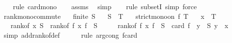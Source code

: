 \begin{isabellebody}
\ \ \isamarkupfalse%
\ {\isacharparenleft}{\kern0pt}rule\ card{\isacharunderscore}{\kern0pt}mono{\isacharparenright}{\kern0pt}\isanewline
\ \ \isamarkupfalse%
\ assms\ \isamarkupfalse%
\ simp\isanewline
\ \ \isamarkupfalse%
\ {\isacharparenleft}{\kern0pt}rule\ subsetI{\isacharcomma}{\kern0pt}\ simp{\isacharcomma}{\kern0pt}\ force{\isacharparenright}{\kern0pt}%
\endisatagproof
{\isafoldproof}%
%
\isadelimproof
\isanewline
%
\endisadelimproof
\isanewline
{}\isamarkupfalse%
\ rank{\isacharunderscore}{\kern0pt}mono{\isacharunderscore}{\kern0pt}commute{\isacharcolon}{\kern0pt}\isanewline
\ \ \ {\isachardoublequoteopen}finite\ S{\isachardoublequoteclose}\isanewline
\ \ \ {\isachardoublequoteopen}S\ {\isasymsubseteq}\ T{\isachardoublequoteclose}\isanewline
\ \ \ {\isachardoublequoteopen}strict{\isacharunderscore}{\kern0pt}mono{\isacharunderscore}{\kern0pt}on\ f\ T{\isachardoublequoteclose}\isanewline
\ \ \ {\isachardoublequoteopen}x\ {\isasymin}\ T{\isachardoublequoteclose}\isanewline
\ \ \ {\isachardoublequoteopen}rank{\isacharunderscore}{\kern0pt}of\ x\ S\ {\isacharequal}{\kern0pt}\ rank{\isacharunderscore}{\kern0pt}of\ {\isacharparenleft}{\kern0pt}f\ x{\isacharparenright}{\kern0pt}\ {\isacharparenleft}{\kern0pt}f\ {\isacharbackquote}{\kern0pt}\ S{\isacharparenright}{\kern0pt}{\isachardoublequoteclose}\isanewline
%
\isadelimproof
%
\endisadelimproof
%
\isatagproof
{}\isamarkupfalse%
\ {\isacharminus}{\kern0pt}\isanewline
\ \ \isamarkupfalse%
\ {\isachardoublequoteopen}rank{\isacharunderscore}{\kern0pt}of\ {\isacharparenleft}{\kern0pt}f\ x{\isacharparenright}{\kern0pt}\ {\isacharparenleft}{\kern0pt}f\ {\isacharbackquote}{\kern0pt}\ S{\isacharparenright}{\kern0pt}\ {\isacharequal}{\kern0pt}\ card\ {\isacharparenleft}{\kern0pt}f\ {\isacharbackquote}{\kern0pt}\ {\isacharbraceleft}{\kern0pt}y\ {\isasymin}\ S{\isachardot}{\kern0pt}\ y\ {\isacharless}{\kern0pt}\ x{\isacharbraceright}{\kern0pt}{\isacharparenright}{\kern0pt}{\isachardoublequoteclose}\isanewline
\ \ \ \ \isamarkupfalse%
\ {\isacharparenleft}{\kern0pt}simp\ add{\isacharcolon}{\kern0pt}rank{\isacharunderscore}{\kern0pt}of{\isacharunderscore}{\kern0pt}def{\isacharparenright}{\kern0pt}\isanewline
\ \ \ \ \isamarkupfalse%
\ {\isacharparenleft}{\kern0pt}rule\ arg{\isacharunderscore}{\kern0pt}cong{\isacharbrackleft}{\kern0pt}\ f{\isacharequal}{\kern0pt}{\isachardoublequoteopen}card{\isachardoublequoteclose}{\isacharbrackright}{\kern0pt}{\isacharparenright}{\kern0pt}\isanewline

\end{isabellebody}
